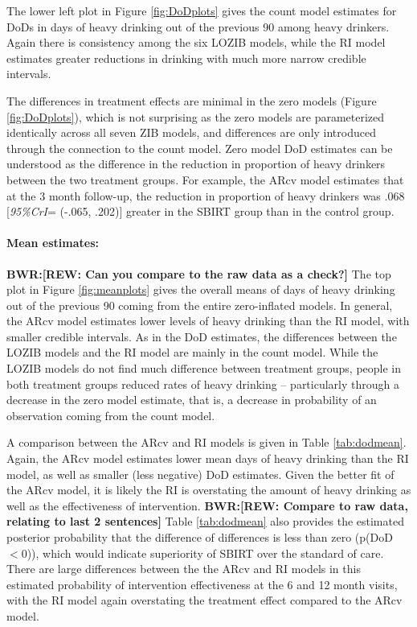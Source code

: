 \documentclass[12pt]{article}
\def\bwr#1{{\color{violet}\textbf{BWR:[#1]}}}
\begin{document}
The lower left plot in Figure \ref{fig:DoDplots} gives the count model estimates for DoDs in days of heavy drinking out of the previous 90 among heavy drinkers. Again there is consistency among the six LOZIB models, while the RI model estimates greater reductions in drinking with much more narrow credible intervals.

The differences in treatment effects are minimal in the zero models (Figure \ref{fig:DoDplots}), which is not surprising as the zero models are parameterized identically across all seven ZIB models, and differences are only introduced through the connection to the count model. Zero model DoD estimates can be understood as the difference in the reduction in proportion of heavy drinkers between the two treatment groups. For example, the ARcv model estimates that at the 3 month follow-up, the reduction in proportion of heavy drinkers was .068 [\textit{95\%CrI}= (-.065, .202)] greater in the SBIRT group than in the control group.

\paragraph{Mean estimates:}
\bwr{REW: Can you compare to the raw data as a check?}
The top plot in Figure \ref{fig:meanplots} gives the overall means of days of heavy drinking out of the previous 90 coming from the entire zero-inflated models. In general, the ARcv model estimates lower levels of heavy drinking than the RI model, with smaller credible intervals. As in the DoD estimates, the differences between the LOZIB models and the RI model are mainly in the count model. While the LOZIB models do not find much difference between treatment groups, people in both treatment groups reduced rates of heavy drinking -- particularly through a decrease in the zero model estimate, that is, a decrease in probability of an observation coming from the count model.

A comparison between the ARcv and RI models is given in Table \ref{tab:dodmean}. Again, the ARcv model estimates lower mean days of heavy drinking than the RI model, as well as smaller (less negative) DoD estimates. Given the better fit of the ARcv model, it is likely the RI is overstating the amount of heavy drinking as well as the effectiveness of intervention. \bwr{REW: Compare to raw data, relating to last 2 sentences} Table \ref{tab:dodmean} also provides the estimated posterior probability that the difference of differences is less than zero (p(DoD$<0$)), which would indicate superiority of SBIRT over the standard of care. There are large differences between the the ARcv and RI models in this estimated probability of intervention effectiveness at the 6 and 12 month visits, with the RI model again overstating the treatment effect compared to the ARcv model. 
\end{document}

